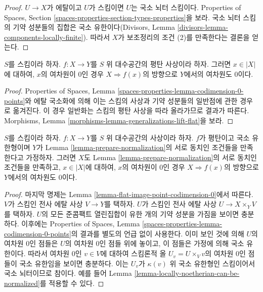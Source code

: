 \begin{proof}
$U \to X$가 에탈이고 $U$가 스킴이면 $U$는 국소 뇌터 스킴이다.
Properties of Spaces, Section
\ref{spaces-properties-section-types-properties}을 보라. 국소 뇌터 스킴의
기약 성분들의 집합은 국소 유한이다(Divisors, Lemma
\ref{divisors-lemma-components-locally-finite}). 따라서 $X$가 보조정리의
조건 (2)를 만족한다는 결론을 얻는다.
\end{proof}

\begin{lemma}
\label{lemma-flat-image-point-codimension-0}
$S$를 스킴이라 하자. $f : X \to Y$를 $S$ 위 대수공간의 평탄 사상이라
하자. 그러면 $x \in |X|$에 대하여, $x$의 여차원이 $0$인 경우
$X \Rightarrow f(x)$의 방향으로 $Y$에서의 여차원도 $0$이다.
\end{lemma}

\begin{proof}
Properties of Spaces, Lemma
\ref{spaces-properties-lemma-codimension-0-points}와 에탈 국소화에 의해 이는
스킴의 사상과 기약 성분들의 일반점에 관한 경우로 옮겨진다. 이 경우
일반화는 스킴의 평탄 사상을 따라 올라가므로 결과가 따른다. Morphisms,
Lemma \ref{morphisms-lemma-generalizations-lift-flat}을 보라.
\end{proof}

\begin{lemma}
\label{lemma-flat-locally-finite-type-points-codimension-0}
$S$를 스킴이라 하자. $f : X \to Y$를 $S$ 위 대수공간의 사상이라 하자.
$f$가 평탄이고 국소 유한형이며 $Y$가 Lemma
\ref{lemma-prepare-normalization}의 서로 동치인 조건들을 만족한다고
가정하자. 그러면 $X$도 Lemma \ref{lemma-prepare-normalization}의 서로
동치인 조건들을 만족하고, $x \in |X|$에 대하여, $x$의 여차원이 $0$인
경우 $X \Rightarrow f(x)$의 방향으로 $Y$에서의 여차원도 $0$이다.
\end{lemma}

\begin{proof}
마지막 명제는 Lemma \ref{lemma-flat-image-point-codimension-0}에서 따른다.
$V$가 스킴인 전사 에탈 사상 $V \to Y$를 택하자. $U$가 스킴인 전사
에탈 사상 $U \to X \times_Y V$를 택하자. $U$의 모든 준콤팩트
열린집합이 유한 개의 기약 성분을 가짐을 보이면 충분하다. 이후에는
Properties of Spaces, Lemma
\ref{spaces-properties-lemma-codimension-0-points}의 결과를 별도의 언급
없이 사용한다. 이미 보인 것에 의해 $U$의 여차원 $0$인 점들은
$U$의 여차원 $0$인 점들 위에 놓이고, 이 점들은 가정에 의해 국소
유한이다. 따라서 여차원 $0$인 $v \in V$에 대하여 스킴론적 올
$U_v = U \times_V v$의 여차원 $0$인 점들이 국소 유한임을 보이면
충분하다. 이는 $U_v$가 $\kappa(v)$ 위 국소 유한형인 스킴이어서 국소
뇌터이므로 참이다. 예를 들어 Lemma
\ref{lemma-locally-noetherian-can-be-normalized}를 적용할 수 있다.
\end{proof}

